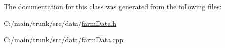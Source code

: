 The documentation for this class was generated from the following files:\begin{DoxyCompactItemize}
\item 
C:/main/trunk/src/data/\hyperlink{farm_data_8h}{farmData.h}\item 
C:/main/trunk/src/data/\hyperlink{farm_data_8cpp}{farmData.cpp}\end{DoxyCompactItemize}
